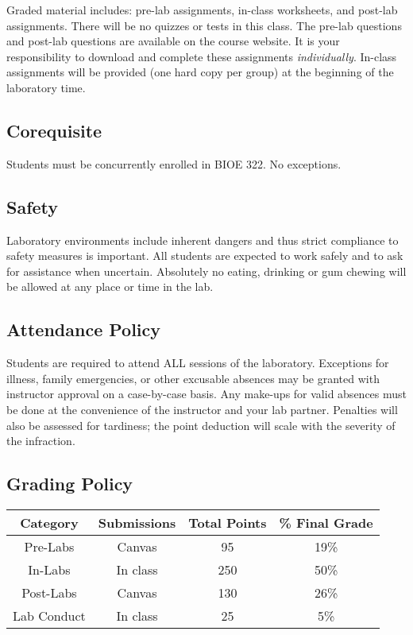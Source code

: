 \documentclass{article}
\begin{document}
Graded material includes: pre-lab assignments, in-class worksheets, and post-lab assignments.  There will be no quizzes or tests in this class. The pre-lab questions and post-lab questions are available on the course website. It is your responsibility to download and complete these assignments \textit{individually}. In-class assignments will be provided (one hard copy per group) at the beginning of the laboratory time.


\subsection*{Corequisite}
Students must be concurrently enrolled in BIOE 322. No exceptions.

\subsection*{Safety}
Laboratory environments include inherent dangers and thus strict compliance to safety measures is important. All students are expected to work safely and to ask for assistance when uncertain. Absolutely no eating, drinking or gum chewing will be allowed at any place or time in the lab.

\subsection*{Attendance Policy}
Students are required to attend ALL sessions of the laboratory. Exceptions for illness, family emergencies, or other excusable absences may be granted with instructor approval on a case-by-case basis. Any make-ups for valid absences must be done at the convenience of the instructor and your lab partner. Penalties will also be assessed for tardiness; the point deduction will scale with the severity of the infraction.

\subsection*{Grading Policy}

\begin{table}[h!]
	\centering
\begin{tabular}[h!]{cccc}
\toprule
	Category & Submissions & Total Points & \% Final Grade\\
	\midrule
	Pre-Labs & Canvas & 95 & 19\%\\
	In-Labs & In class & 250 & 50\%\\
	Post-Labs & Canvas & 130 & 26\%\\
	Lab Conduct & In class & 25 & 5\%\\
	\bottomrule
\end{tabular}
\end{table}
\end{document}
